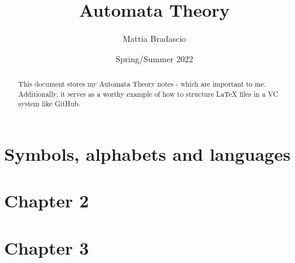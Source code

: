 \documentclass[12pt, letterpaper]{article}
\title{Automata Theory}
\author{Mattia Bradascio}
\date{Spring/Summer 2022}
\begin{document}
\begin{titlepage}
\maketitle
\begin{abstract}

    This document stores my Automata Theory notes - which are important to me.
    Additionally, it serves as a worthy example of how to structure \LaTeX{} files in a VC system like GitHub.

\end{abstract}

\end{titlepage}

\section{Symbols, alphabets and languages}


\section{Chapter 2}


\section{Chapter 3}

\end{document}
